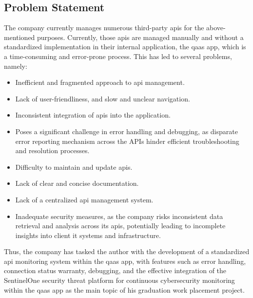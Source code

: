 \begin{multicols}{2}
      \section{Problem Statement}
      The company currently manages numerous third-party \acrshort{api}s for the above-mentioned purposes.
      Currently, those \acrshort{api}s are managed manually and without a standardized implementation in their
      internal application, the \acrshort{qaas} app, which is a time-consuming and error-prone process. This has
      led to several problems, namely:
      \begin{itemize}
            \item Inefficient and fragmented approach to \acrshort{api} management.
            \item Lack of user-friendliness, and slow and unclear navigation.
            \item Inconsistent integration of \acrshort{api}s into the application.
            \item Poses a significant challenge in error handling and debugging, as disparate error reporting
                  mechanism across the APIs hinder efficient troubleshooting and resolution processes.
            \item Difficulty to maintain and update \acrshort{api}s.
            \item Lack of clear and concise documentation.
            \item Lack of a centralized \acrshort{api} management system.
            \item Inadequate security measures, as the company risks inconsistent data retrieval and analysis
                  across its \acrshort{api}s, potentially leading to incomplete insights into client \acrshort{it}
                  systems and infrastructure.
      \end{itemize}
      Thus, the company has tasked the author with the development of a standardized \acrshort{api} monitoring
      system within the \acrshort{qaas} app, with features such as error handling, connection status warranty,
      debugging, and the effective integration of the SentinelOne security threat platform for continuous
      cybersecurity monitoring within the \acrshort{qaas} app as the main topic of his graduation work placement
      project.


\end{multicols}
